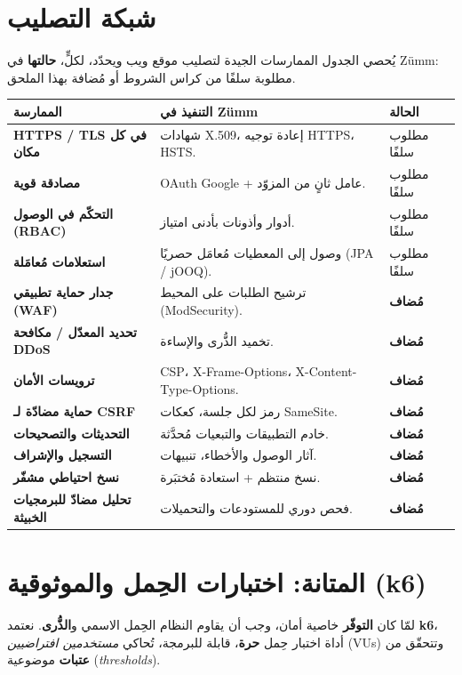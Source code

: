 \section{شبكة التصليب}
يُحصي الجدول الممارسات الجيدة لتصليب موقع ويب ويحدّد، لكلٍّ، \textbf{حالتها} في
Zümm: مطلوبة سلفًا من كراس الشروط أو مُضافة بهذا الملحق.
\begin{xltabular}{\textwidth}{>{\bfseries}p{4.2cm} X C{2.2cm}}
\toprule
\textbf{الممارسة} & \textbf{التنفيذ في Zümm} & \textbf{الحالة} \\
\midrule
\endhead
HTTPS / TLS في كل مكان & شهادات X.509، إعادة توجيه HTTPS، HSTS. & مطلوب سلفًا \\
مصادقة قوية & OAuth Google + عامل ثانٍ من المزوّد. & مطلوب سلفًا \\
التحكّم في الوصول (RBAC) & أدوار وأذونات بأدنى امتياز. & مطلوب سلفًا \\
استعلامات مُعامَلة & وصول إلى المعطيات مُعامَل حصريًا (JPA / jOOQ). & مطلوب سلفًا \\
جدار حماية تطبيقي (WAF) & ترشيح الطلبات على المحيط (ModSecurity). & \textbf{مُضاف} \\
تحديد المعدّل / مكافحة DDoS & تخميد الذُّرى والإساءة. & \textbf{مُضاف} \\
ترويسات الأمان & CSP، X-Frame-Options، X-Content-Type-Options. & \textbf{مُضاف} \\
حماية مضادّة لـ CSRF & رمز لكل جلسة، كعكات SameSite. & \textbf{مُضاف} \\
التحديثات والتصحيحات & خادم التطبيقات والتبعيات مُحدَّثة. & \textbf{مُضاف} \\
التسجيل والإشراف & آثار الوصول والأخطاء، تنبيهات. & \textbf{مُضاف} \\
نسخ احتياطي مشفّر & نسخ منتظم + استعادة مُختبَرة. & \textbf{مُضاف} \\
تحليل مضادّ للبرمجيات الخبيثة & فحص دوري للمستودعات والتحميلات. & \textbf{مُضاف} \\
\bottomrule
\end{xltabular}

\section{المتانة: اختبارات الحِمل والموثوقية (k6)}
لمّا كان \textbf{التوفّر} خاصية أمان، وجب أن يقاوم النظام الحِمل الاسمي
و\textbf{الذُّرى}. نعتمد \textbf{k6}، أداة اختبار حِمل \textbf{حرة}، قابلة
للبرمجة، تُحاكي \emph{مستخدمين افتراضيين} (VUs) وتتحقّق من \textbf{عتبات}
موضوعية (\emph{thresholds}).


